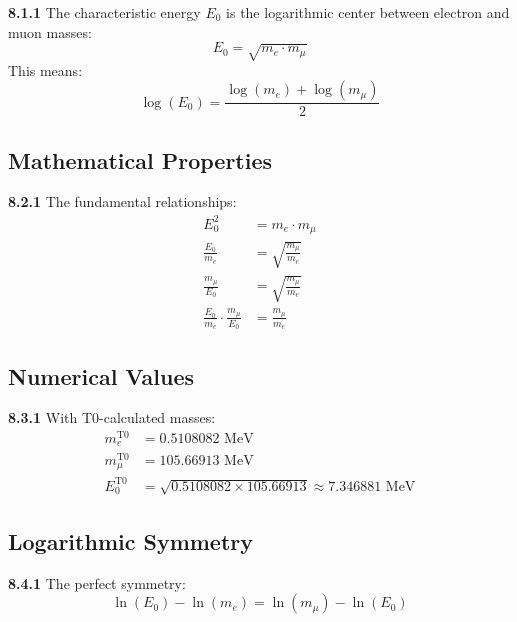 \documentclass[12pt,a4paper]{article}
\newcommand{\Ezero}{E_0}
\begin{document}
\begin{tcolorbox}[colback=yellow!10!white,colframe=red!75!black,title=Fundamental Definition]
	\noindent \textbf{8.1.1} The characteristic energy $\Ezero$ is the logarithmic center between electron and muon masses:
	\begin{equation}
		\boxed{\Ezero = \sqrt{m_e \cdot m_\mu}}
		\label{eq:E0_fundamental}
	\end{equation}
	This means:
	\begin{equation}
		\log(\Ezero) = \frac{\log(m_e) + \log(m_\mu)}{2}
		\label{eq:E0_logarithmic}
	\end{equation}
\end{tcolorbox}

\subsection{Mathematical Properties}

\noindent \textbf{8.2.1} The fundamental relationships:
\begin{align}
	\Ezero^2 &= m_e \cdot m_\mu \label{eq:E0_squared} \\
	\frac{\Ezero}{m_e} &= \sqrt{\frac{m_\mu}{m_e}} \label{eq:E0_ratio1} \\
	\frac{m_\mu}{\Ezero} &= \sqrt{\frac{m_\mu}{m_e}} \label{eq:E0_ratio2} \\
	\frac{\Ezero}{m_e} \cdot \frac{m_\mu}{\Ezero} &= \frac{m_\mu}{m_e} \label{eq:E0_product}
\end{align}

\subsection{Numerical Values}

\noindent \textbf{8.3.1} With T0-calculated masses:
\begin{align}
	m_e^{\text{T0}} &= 0.5108082 \text{ MeV} \\
	m_\mu^{\text{T0}} &= 105.66913 \text{ MeV} \\
	\Ezero^{\text{T0}} &= \sqrt{0.5108082 \times 105.66913} \approx 7.346881 \text{ MeV}
\end{align}

\subsection{Logarithmic Symmetry}

\noindent \textbf{8.4.1} The perfect symmetry:
\begin{equation}
	\boxed{\ln(\Ezero) - \ln(m_e) = \ln(m_\mu) - \ln(\Ezero)}
	\label{eq:log_symmetry}
\end{equation}
\end{document}
